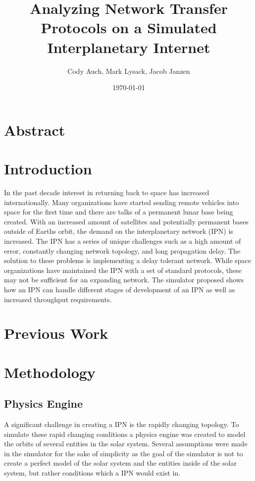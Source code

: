 \documentclass[a4paper,12pt]{article}
\title{Analyzing Network Transfer Protocols on a Simulated Interplanetary Internet}
\author{Cody Auch, Mark Lysack, Jacob Janzen}
\date{\today}
\begin{document}
\maketitle

\section{Abstract}

\section{Introduction}

In the past decade interest in returning back to space has increased internationally. Many organizations 
have started sending remote vehicles into space for the first time \cite{(indian space program, spaceX, ect)}
and there are talks of a permanent lunar base being created. With an increased amount of satellites and potentially 
permanent bases outside of Earths orbit, the demand on the interplanetary network (IPN) is increased. The IPN has a 
series of unique challenges such as a high amount of error, constantly changing network topology, and long 
propagation delay. The solution to these problems is implementing a delay tolerant network. While space organizations 
have maintained the IPN with a set of standard protocols, these may not be sufficient for an expanding network.
The simulator proposed shows how an IPN can handle different stages of development of an IPN as well as increased 
throughput requirements.

\section{Previous Work}

\section{Methodology}

\subsection{Physics Engine}

A significant challenge in creating a IPN is the rapidly changing topology. To simulate 
these rapid changing conditions a physics engine was created to model the orbits of several 
entities in the solar system. Several assumptions were made in the simulator for the sake of 
simplicity as the goal of the simulator is not to create a perfect model of the solar system 
and the entities inside of the solar system, but rather conditions which a IPN would exist in. 
\end{document}
